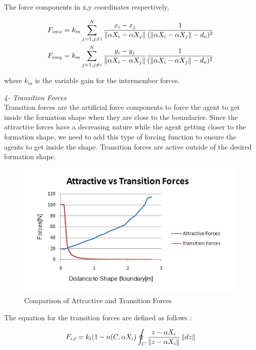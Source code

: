 The force components in x,y coordinates respectively,

\begin{align}
\begin{split}
&F_{imx} = k_m \sum_{j=1, j\neq i}^{N}\frac{x_i- x_j}{\left\lVert\alpha X_i - \alpha X_j\right\rVert}  \frac{1}{(\left\lVert\alpha X_i - \alpha X_j\right\rVert - d_o)^2}\\
&F_{imy} = k_m \sum_{j=1, j\neq i}^{N}\frac{y_i- y_j}{\left\lVert\alpha X_i - \alpha X_j\right\rVert}  \frac{1}{(\left\lVert\alpha X_i - \alpha X_j\right\rVert - d_o)^2}\\
\end{split}
\end{align}
		
where $k_m$ is the variable gain for the intermember forces.  \newline
			
\textit{4- Transition Forces} \\ 		
Transition forces are the artificial force components to force the agent to get inside the formation shape when they are close to the boundaries. Since the attractive forces have a decreasing nature while the agent getting closer to the formation shape, we need to add this type of forcing function to ensure the agents to get inside the shape. Transition forces are active outside of the desired formation shape.
			
\begin{figure}[H]
\caption{Comparison of Attractive and Transition Forces}
\centering
\includegraphics[scale = 0.80]{transition_forces}
\end{figure}		

The equation for the transition forces are defined as follows \cite{17}:	
				
\begin{equation}
F_{i,t} = k_t (1-n(C,\alpha X_i) \oint_C \frac{z-\alpha X_i}{\left\lVert z-\alpha X_i\right\rVert}\left\lVert dz\right\rVert
\end{equation}
				
